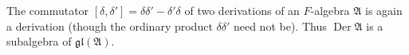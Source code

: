 The commutator $[\delta, \delta'] = \delta\delta' - \delta'\delta$ of two derivations of an $F$-algebra $\mathfrak{A}$ is again a derivation (though the ordinary product $\delta\delta'$ need not be). Thus $\operatorname{Der} \mathfrak{A}$ is a subalgebra of $\mathfrak{gl}(\mathfrak{A})$.
